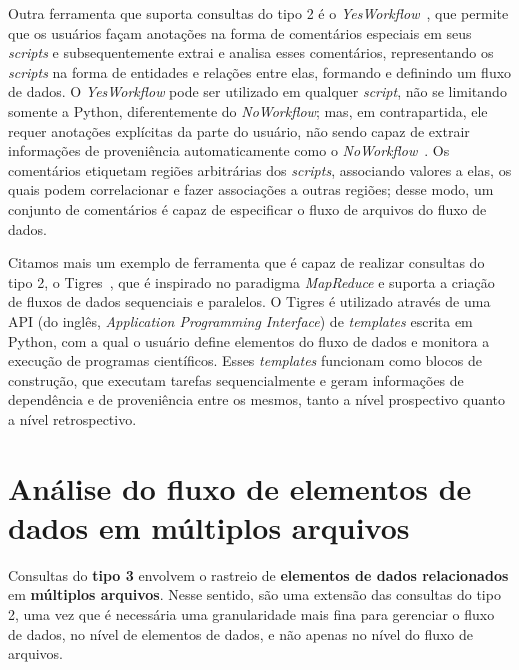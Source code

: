 Outra ferramenta que suporta consultas do tipo 2 é o \textit{YesWorkflow}~\cite{mcphillips2015yesworkflow}, que permite que os usuários façam anotações na forma de comentários especiais em seus \textit{scripts} e subsequentemente extrai e analisa esses comentários, representando os \textit{scripts} na forma de entidades e relações entre elas, formando e definindo um fluxo de dados. O \textit{YesWorkflow} pode ser utilizado em qualquer \textit{script}, não se limitando somente a Python, diferentemente do \textit{NoWorkflow}; mas, em contrapartida, ele requer anotações explícitas da parte do usuário, não sendo capaz de extrair informações de proveniência automaticamente como o \textit{NoWorkflow}~\cite{Pimentel2016}. Os comentários etiquetam regiões arbitrárias dos \textit{scripts}, associando valores a elas, os quais podem correlacionar e fazer associações a outras regiões; desse modo, um conjunto de comentários é capaz de especificar o fluxo de arquivos do fluxo de dados.



Citamos mais um exemplo de ferramenta que é capaz de realizar consultas do tipo 2, o Tigres~\cite{hendrix2016tigres}, que é inspirado no paradigma \textit{MapReduce} e suporta a criação de fluxos de dados sequenciais e paralelos. O Tigres é utilizado através de uma  API (do inglês, \textit{Application Programming Interface}) de \textit{templates} escrita em Python, com a qual o usuário define elementos do fluxo de dados e monitora a execução de programas científicos. Esses \textit{templates} funcionam como blocos de construção, que executam tarefas sequencialmente e geram informações de dependência e de proveniência entre os mesmos, tanto a nível prospectivo quanto a nível retrospectivo.

\section{Análise do fluxo de elementos de dados em múltiplos arquivos}%
\label{sec:rastreio-de-elemento-de-dados-em-multiplos-arquivos}

Consultas do \textbf{tipo 3} envolvem o rastreio de \textbf{elementos de dados relacionados} em \textbf{múltiplos arquivos}. Nesse sentido, são uma extensão das consultas do tipo 2, uma vez que é necessária uma granularidade mais fina para gerenciar o fluxo de dados, no nível de elementos de dados, e não apenas no nível do fluxo de arquivos.

